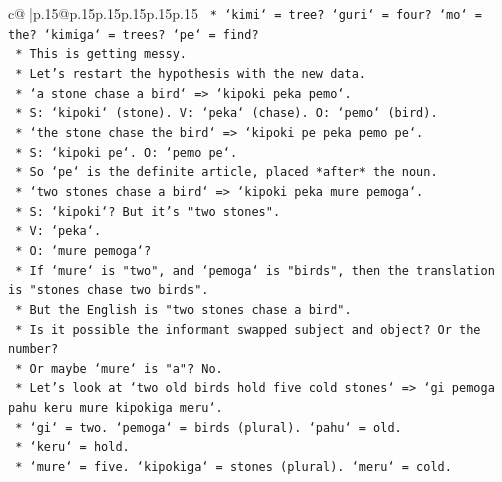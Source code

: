 \documentclass{article}
\begin{document}
{\begin{supertabular}{c@{$\;$}|p{.15\linewidth}@{}p{.15\linewidth}p{.15\linewidth}p{.15\linewidth}p{.15\linewidth}p{.15\linewidth}}
{{{\texttt{                            *   `kimi` = tree? `guri` = four? `mo` = the? `kimiga` = trees? `pe` = find?} \\
\texttt{                            *   This is getting messy.} \\
\texttt{                            *   Let's restart the hypothesis with the new data.} \\
\texttt{                            *   `a stone chase a bird` => `kipoki peka pemo`.} \\
\texttt{                                *   S: `kipoki` (stone). V: `peka` (chase). O: `pemo` (bird).} \\
\texttt{                            *   `the stone chase the bird` => `kipoki pe peka pemo pe`.} \\
\texttt{                                *   S: `kipoki pe`. O: `pemo pe`.} \\
\texttt{                                *   So `pe` is the definite article, placed *after* the noun.} \\
\texttt{                            *   `two stones chase a bird` => `kipoki peka mure pemoga`.} \\
\texttt{                                *   S: `kipoki`? But it's "two stones".} \\
\texttt{                                *   V: `peka`.} \\
\texttt{                                *   O: `mure pemoga`?} \\
\texttt{                                *   If `mure` is "two", and `pemoga` is "birds", then the translation is "stones chase two birds".} \\
\texttt{                                *   But the English is "two stones chase a bird".} \\
\texttt{                                *   Is it possible the informant swapped subject and object? Or the number?} \\
\texttt{                                *   Or maybe `mure` is "a"? No.} \\
\texttt{                                *   Let's look at `two old birds hold five cold stones` => `gi pemoga pahu keru mure kipokiga meru`.} \\
\texttt{                                    *   `gi` = two. `pemoga` = birds (plural). `pahu` = old.} \\
\texttt{                                    *   `keru` = hold.} \\
\texttt{                                    *   `mure` = five. `kipokiga` = stones (plural). `meru` = cold.} \\
}}}
\end{supertabular}}
\end{document}
